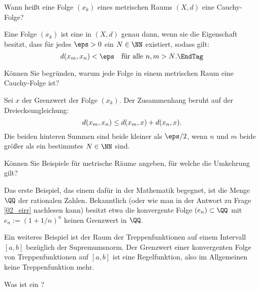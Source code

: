 \begin{frage}
  Wann heißt eine Folge $(x_k)$ eines metrischen Raums $(X,d)$ 
  eine Cauchy-Folge?
\end{frage}

\begin{antwort}
  Eine Folge $(x_k)$ ist eine  in $(X,d)$ genau dann, 
  wenn sie die Eigenschaft besitzt, dass für jedes $\eps>0$ ein $N\in \NN$ 
  existiert, sodass gilt:
  \[
  d(x_m,x_n)<\eps \quad\text{für alle $n,m>N$}.
  \EndTag
  \] 
\end{antwort}

\begin{frage}
  Können Sie begründen, warum jede  Folge in einem 
  metrischen Raum eine Cauchy-Folge ist?
\end{frage}

\begin{antwort}
  Sei $x$ der Grenzwert der Folge $(x_k)$. 
  Der Zusammenhang beruht auf der Dreiecksungleichung:
  \begin{equation}
    d(x_m, x_n ) \le d(x_m,x) + d( x_n, x ). 
    \notag
  \end{equation}
  Die beiden hinteren Summen sind beide kleiner als $\eps/2$, wenn 
  $n$ und $m$ beide größer als ein bestimmtes $N\in \NN$ sind.
  \AntEnd
\end{antwort}

\begin{frage}
  Können Sie Beispiele für metrische Räume angeben, für welche die 
  Umkehrung  gilt? 
\end{frage} 

\begin{antwort}
  Das erste Beispiel, das einem dafür in der Mathematik begegnet, ist die 
  Menge $\QQ$ der rationalen Zahlen. 
  Bekanntlich (oder wie man in der Antwort zu Frage \ref{02_eirr} 
  nachlesen kann) 
  besitzt etwa die konvergente 
  Folge $(e_n)\subset \QQ$ mit $e_n:= (1+1/n)^n$ keinen Grenzwert in $\QQ$. 

  Ein weiteres Beispiel ist der Raum der Treppenfunktionen 
  auf einem Intervall $[a,b]$ bezüglich der 
  Supremumsnorm. Der Grenzwert einer konvergenten 
  Folge von Treppenfunktionen auf $[a,b]$ ist eine Regelfunktion, also 
  im Allgemeinen keine Treppenfunktion mehr. 
  \AntEnd
\end{antwort}

\begin{frage}\label{09_voll}
  Was ist ein ?
\end{frage}

